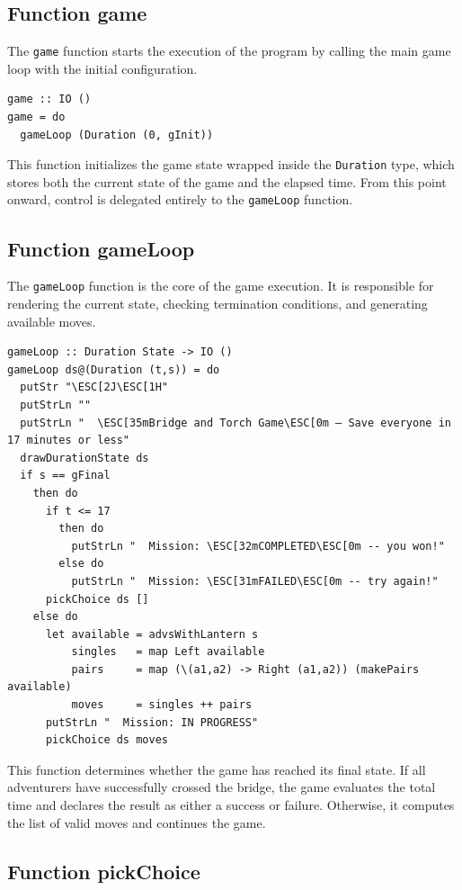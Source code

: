 \documentclass[a4paper,12pt]{report}
\begin{document}
\subsection{Function game}

The \texttt{game} function starts the execution of the program by calling the main game loop with the initial configuration.

\begin{verbatim}
game :: IO ()
game = do
  gameLoop (Duration (0, gInit))
\end{verbatim}

This function initializes the game state wrapped inside the \texttt{Duration} type, which stores both the current state of the game and the elapsed time. From this point onward, control is delegated entirely to the \texttt{gameLoop} function.

\subsection{Function gameLoop}

The \texttt{gameLoop} function is the core of the game execution. It is responsible for rendering the current state, checking termination conditions, and generating available moves.

\begin{verbatim}
gameLoop :: Duration State -> IO ()
gameLoop ds@(Duration (t,s)) = do
  putStr "\ESC[2J\ESC[1H"
  putStrLn ""
  putStrLn "  \ESC[35mBridge and Torch Game\ESC[0m — Save everyone in 17 minutes or less"
  drawDurationState ds
  if s == gFinal
    then do
      if t <= 17
        then do
          putStrLn "  Mission: \ESC[32mCOMPLETED\ESC[0m -- you won!"
        else do
          putStrLn "  Mission: \ESC[31mFAILED\ESC[0m -- try again!"
      pickChoice ds []
    else do
      let available = advsWithLantern s
          singles   = map Left available
          pairs     = map (\(a1,a2) -> Right (a1,a2)) (makePairs available)
          moves     = singles ++ pairs
      putStrLn "  Mission: IN PROGRESS"
      pickChoice ds moves
\end{verbatim}

This function determines whether the game has reached its final state. If all adventurers have successfully crossed the bridge, the game evaluates the total time and declares the result as either a success or failure. Otherwise, it computes the list of valid moves and continues the game.

\subsection{Function pickChoice}
\end{document}
